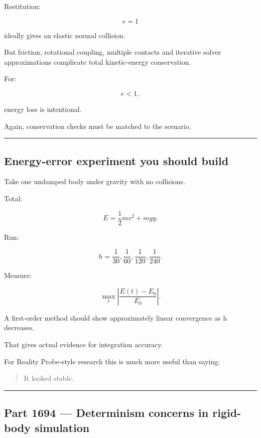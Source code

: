 Restitution:

\[
e=1
\]

ideally gives an elastic normal collision.

But friction, rotational coupling, multiple contacts and iterative solver approximations complicate total kinetic-energy conservation.

For:

\[
e<1,
\]

energy loss is intentional.

Again, conservation checks must be matched to the scenario.

\begin{center}\rule{0.5\linewidth}{0.5pt}\end{center}

\subsection{Energy-error experiment you should build}\label{06-engine-ii-ch039-energy-error-experiment-you-should-build}

Take one undamped body under gravity with no collisions.

Total:

\[
E
=
\frac12mv^2+
mgy.
\]

Run:

\[
h=\frac1{30},
\frac1{60},
\frac1{120},
\frac1{240}.
\]

Measure:

\[
\max_t
\left|
\frac{E(t)-E_0}{E_0}
\right|.
\]

A first-order method should show approximately linear convergence as h decreases.

That gives actual evidence for integration accuracy.

For Reality Probe-style research this is much more useful than saying:

\begin{quote}
It looked stable.
\end{quote}

\begin{center}\rule{0.5\linewidth}{0.5pt}\end{center}

\subsection{Part 1694 --- Determinism concerns in rigid-body simulation}\label{06-engine-ii-ch039-part-1694-determinism-concerns-in-rigid-body-simulation}

